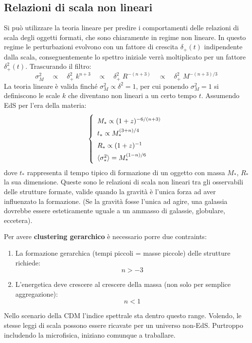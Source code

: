 \subsection{Relazioni di scala non lineari}\label{8:sec:relnlin}
Si può utilizzare la teoria lineare per predire i comportamenti delle relazioni di scala degli oggetti formati, che sono chiaramente in regime non lineare. In questo regime le perturbazioni evolvono con un fattore di crescita $\delta_+ (t)$ indipendente dalla scala, conseguentemente lo spettro iniziale verrà moltiplicato per un fattore $\delta_+^2 (t)$. Trascurando il filtro:
$$
\sigma_M^2 \quad\propto\quad \delta_+^2\; k^{n+3} \quad\propto\quad \delta_+^2\;  R^{-(n+3)} \quad\propto\quad \delta_+^2\;  M^{-(n+3)/3}
$$
La teoria lineare è valida finché $\sigma_M^2 \propto \delta^2 = 1$, per cui ponendo $\sigma_M^2 =1$ si definiscono le scale $k$ che diventano non lineari a un certo tempo $t$. Assumendo EdS per l'era della materia:
\begin{equation}\left\{
    \def\arraystretch{1.5}
        \begin{array}{l}
        M_* \propto (1+z)^{-6/(n+3)} \\
        t_* \propto M_* ^{(3+n)/4} \\
        R_* \propto (1+z)^{-1}\\
        \langle \sigma_*^2 \rangle = M_*^{(1-n)/6}
    \end{array}\right. 
\end{equation}
dove $t_*$ rappresenta il tempo tipico di formazione di un oggetto con massa $M_*$, $R_*$ la sua dimensione. Queste sono le relazioni di scala non lineari tra gli osservabili delle strutture formate, valide quando la gravità è l’unica forza ad
aver influenzato la formazione. (Se la gravità fosse l'unica ad agire, una galassia dovrebbe essere esteticamente uguale a un ammasso di galassie, globulare, eccetera). 

\vspace{1em}
\noindent Per avere \textbf{clustering gerarchico} è necessario porre due contraints:
\begin{enumerate}
    \item La formazione gerarchica (tempi piccoli = masse piccole) delle strutture richiede: $$n>-3$$
    \item L'energetica deve crescere al crescere della massa (non solo per semplice aggregazione): $$n<1$$
\end{enumerate}
Nello scenario della CDM l'indice spettrale sta dentro questo range. Volendo, le stesse leggi di scala possono essere ricavate per un universo non-EdS. Purtroppo includendo la microfisica, iniziano comunque a traballare.

